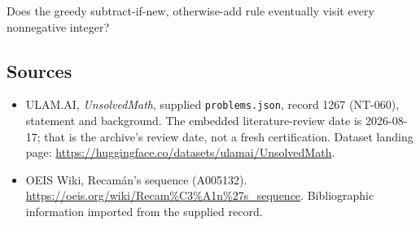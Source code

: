 \documentclass[11pt,a4paper]{article}
\begin{document}
Does the greedy subtract-if-new, otherwise-add rule eventually visit every nonnegative integer?

\subsection{Sources}

{\small

\begin{itemize}

\item[\hypertarget{source:1267:1}{S1}] ULAM.AI, \emph{UnsolvedMath}, supplied \texttt{problems.json}, record 1267 (NT-060), statement and background. The embedded literature-review date is 2026-08-17; that is the archive’s review date, not a fresh certification. Dataset landing page: \url{https://huggingface.co/datasets/ulamai/UnsolvedMath}.

\item[\hypertarget{source:1267:2}{S2}] OEIS Wiki, Recamán's sequence (A005132). \url{https://oeis.org/wiki/Recam%C3%A1n%27s_sequence}. Bibliographic information imported from the supplied record.

\end{itemize}

}

\label{end:1267}
\end{document}
